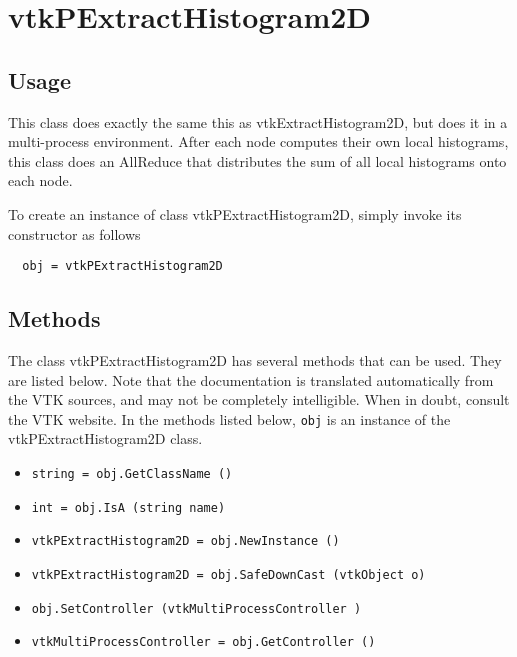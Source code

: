 \section{vtkPExtractHistogram2D}

\subsection{Usage}

  This class does exactly the same this as vtkExtractHistogram2D,
  but does it in a multi-process environment.  After each node
  computes their own local histograms, this class does an AllReduce
  that distributes the sum of all local histograms onto each node.


To create an instance of class vtkPExtractHistogram2D, simply
invoke its constructor as follows
\begin{verbatim}
  obj = vtkPExtractHistogram2D
\end{verbatim}
\subsection{Methods}

The class vtkPExtractHistogram2D has several methods that can be used.
  They are listed below.
Note that the documentation is translated automatically from the VTK sources,
and may not be completely intelligible.  When in doubt, consult the VTK website.
In the methods listed below, \verb|obj| is an instance of the vtkPExtractHistogram2D class.
\begin{itemize}
\item  \verb|string = obj.GetClassName ()|

\item  \verb|int = obj.IsA (string name)|

\item  \verb|vtkPExtractHistogram2D = obj.NewInstance ()|

\item  \verb|vtkPExtractHistogram2D = obj.SafeDownCast (vtkObject o)|

\item  \verb|obj.SetController (vtkMultiProcessController )|

\item  \verb|vtkMultiProcessController = obj.GetController ()|

\end{itemize}
